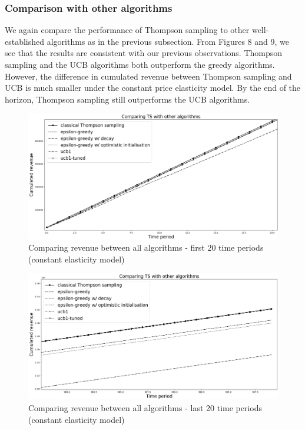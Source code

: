 \documentclass[a4paper]{article}
\begin{document}
\subsubsection{Comparison with other algorithms}
We again compare the performance of Thompson sampling to other well-established algorithms as in the previous subsection. From Figures 8 and 9, we see that the results are consistent with our previous observations. Thompson sampling and the UCB algorithms both outperform the greedy algorithms. However, the difference in cumulated revenue between Thompson sampling and UCB is much smaller under the constant price elasticity model. By the end of the horizon, Thompson sampling still outperforms the UCB algorithms.
\begin{figure}[h!]
	\centering
	\includegraphics[width=1.03\textwidth]{5.png}
	\caption{\label{fig:5}Comparing revenue between all algorithms - first 20 time periods (constant elasticity model)}
\end{figure}
\begin{figure}[h!]
	\centering
	\includegraphics[width=1.03\textwidth]{6.png}
	\caption{\label{fig:6}Comparing revenue between all algorithms - last 20 time periods (constant elasticity model)}
\end{figure}
\newpage
\end{document}
